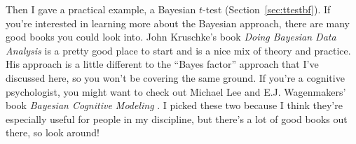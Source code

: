 Then I gave a practical example, a Bayesian $t$-test (Section~\ref{sec:ttestbf}). If you're interested in learning more about the Bayesian approach, there are many good books you could look into. John Kruschke's book {\it Doing Bayesian Data Analysis} is a pretty good place to start \parencite{Kruschke2011} and is a nice mix of theory and practice. His approach is a little different to the ``Bayes factor'' approach that I've discussed here, so you won't be covering the same ground. If you're a cognitive psychologist, you might want to check out Michael Lee and E.J. Wagenmakers' book {\it Bayesian Cognitive Modeling} \parencite{Lee2014}. I picked these two because I think they're especially useful for people in my discipline, but there's a lot of good books out there, so look around!




